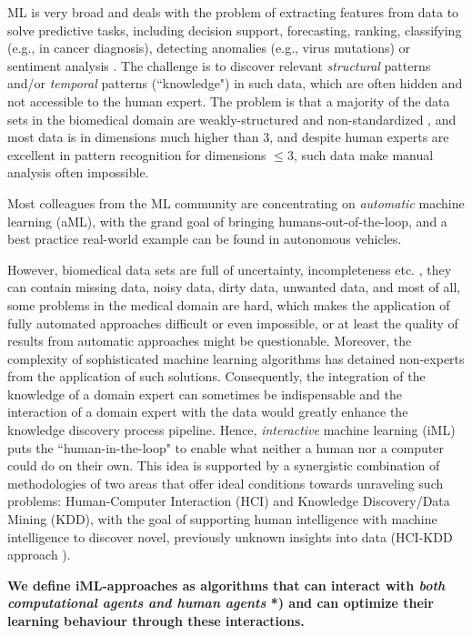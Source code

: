 ML is very broad and deals with the problem of extracting features from data to solve predictive tasks, including decision support, forecasting, ranking, classifying (e.g., in cancer diagnosis), detecting anomalies (e.g., virus mutations) or sentiment analysis \citep{PetzEtAl:2015:Sentiment}. 
The challenge is to discover relevant \emph{structural} patterns and/or \emph{temporal} patterns (``knowledge") in such data, which are often hidden and not accessible to the human expert. The problem is that a majority of the data sets in the biomedical domain are weakly-structured and non-standardized \cite{HolzingerEtAl:2014:KDDBio}, and most data is in dimensions much higher than $3$, and despite human experts are excellent in pattern recognition for dimensions $\leq 3$, such data make manual analysis often impossible.

Most colleagues from the ML community are concentrating on \textit{automatic} machine learning (aML), with the grand goal of bringing humans-out-of-the-loop, and a best practice real-world example can be found in autonomous vehicles.

However, biomedical data sets are full of uncertainty, incompleteness etc. \cite{Holzinger:2014:SpringerTextbook}, they can contain missing data, noisy data, dirty data, unwanted data, and most of all, some problems in the medical domain are hard, which makes the application of fully automated approaches difficult or even impossible, or at least the quality of results from automatic approaches might be questionable. Moreover, the complexity of sophisticated machine learning algorithms has detained non-experts from the application of such solutions.
Consequently, the integration of the knowledge of a domain expert can sometimes be indispensable and the interaction of a domain expert with the data would greatly enhance the knowledge discovery process pipeline.
Hence, \textit{interactive} machine learning (iML) puts the ``human-in-the-loop" to enable what neither a human nor a computer could do on their own. This idea is supported by a synergistic combination of methodologies of two areas that offer ideal conditions towards unraveling such problems: Human-Computer Interaction (HCI) and Knowledge Discovery/Data Mining (KDD), with the goal of supporting human intelligence with machine intelligence to discover novel, previously unknown insights into data (HCI-KDD approach \cite{Holzinger:2013:HCI-KDD}).

\textbf{We define iML-approaches as algorithms that can interact with \textit{both computational agents and human agents} *) and can optimize their learning behaviour through these interactions.}

